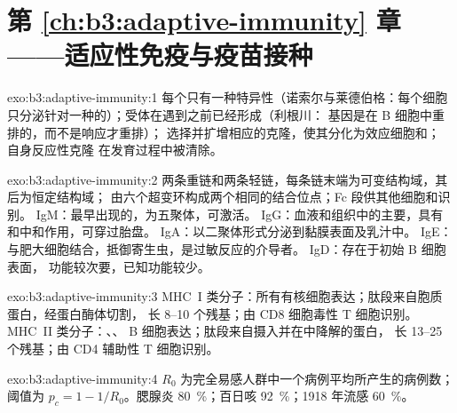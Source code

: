 \section*{第 \ref{ch:b3:adaptive-immunity} 章——适应性免疫与疫苗接种}

\begin{solution}{exo:b3:adaptive-immunity:1}
每个只有一种特异性（诺索尔与莱德伯格：每个细胞
只分泌针对一种的）；受体在遇到之前已经形成（利根川：
基因是在 B 细胞中重排的，而不是响应才重排）；
选择并扩增相应的克隆，使其分化为效应细胞和；
自身反应性克隆
在发育过程中被清除。
\end{solution}

\begin{solution}{exo:b3:adaptive-immunity:2}
两条重链和两条轻链，每条链末端为可变结构域，其后为恒定结构域；
由六个超变环构成两个相同的结合位点；Fc 段供其他细胞和识别。
IgM：最早出现的，为五聚体，可激活。
IgG：血液和组织中的主要，具有和中和作用，可穿过胎盘。
IgA：以二聚体形式分泌到黏膜表面及乳汁中。
IgE：与肥大细胞结合，抵御寄生虫，是过敏反应的介导者。
IgD：存在于初始 B 细胞表面，
功能较次要，已知功能较少。
\end{solution}

\begin{solution}{exo:b3:adaptive-immunity:3}
MHC~I 类分子：所有有核细胞表达；肽段来自胞质蛋白，经蛋白酶体切割，
长 8--10 个残基；由 CD8 细胞毒性 T 细胞识别。MHC~II 类分子：、、
B 细胞表达；肽段来自摄入并在中降解的蛋白，
长 13--25 个残基；由 CD4 辅助性 T 细胞识别。
\end{solution}

\begin{solution}{exo:b3:adaptive-immunity:4}
$R_{0}$ 为完全易感人群中一个病例平均所产生的病例数；
阈值为 $p_{c} = 1 - 1/R_{0}$。腮腺炎
\qty{80}{\%}；百日咳 \qty{92}{\%}；1918 年流感 \qty{60}{\%}。
\end{solution}

